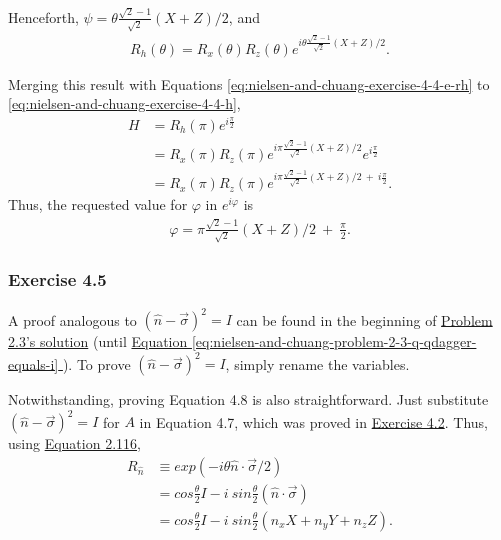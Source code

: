 Henceforth, $\psi = \theta \frac{\sqrt2 - 1}{\sqrt 2} (X + Z) / 2$, and
\begin{align}
    R_h(\theta) = R_x(\theta) R_z(\theta) e^{i \theta \frac{\sqrt2 - 1}{\sqrt 2} (X + Z) / 2}.
\end{align}

Merging this result with Equations
\ref{eq:nielsen-and-chuang-exercise-4-4-e-rh} to \ref{eq:nielsen-and-chuang-exercise-4-4-h},
\begin{align}
    H &= R_h(\pi) e^{i \frac \pi 2} \\
    &= R_x(\pi) R_z(\pi) e^{i \pi \frac{\sqrt2 - 1}{\sqrt 2} (X + Z) / 2} e^{i \frac \pi 2} \\
    &= R_x(\pi) R_z(\pi) e^{i \pi \frac{\sqrt2 - 1}{\sqrt 2} (X + Z) / 2\ +\ i \frac \pi 2}.
\end{align}
Thus, the requested value for $\varphi$ in $e^{i \varphi}$ is
\begin{align}
    \varphi = \pi \frac{\sqrt2 - 1}{\sqrt 2} (X + Z) / 2\ +\ \frac \pi 2.
\end{align}

\subsubsection{Exercise 4.5}
A proof analogous to $(\hat{n} - \vec{\sigma})^2 = I$ can be found in the beginning of
\hyperref[sec:nielsen-and-chuang-problem-2-3]{Problem 2.3's solution}
(until
\hyperref[eq:nielsen-and-chuang-problem-2-3-q-qdagger-equals-i]{
    Equation \ref{eq:nielsen-and-chuang-problem-2-3-q-qdagger-equals-i}
}).
To prove $(\hat{n} - \vec{\sigma})^2 = I$, simply rename the variables.

Notwithstanding, proving Equation 4.8 is also straightforward.
Just substitute $(\hat{n} - \vec{\sigma})^2 = I$ for $A$ in Equation 4.7,
which was proved in \hyperref[sec:nielsen-and-chuang-exercise-4-2]{Exercise 4.2}.
Thus, using \hyperref[sec:nielsen-and-chuang-equation-2-116]{Equation 2.116},
\begin{align}
    R_{\hat{n}} &\equiv exp(-i \theta \hat{n} \cdot \vec{\sigma}/2) \\
    &= cos \frac \theta 2 I - i\ sin \frac \theta 2 (\hat{n} \cdot \vec{\sigma}) \\
    &= cos \frac \theta 2 I - i\ sin \frac \theta 2 (n_x X + n_y Y + n_z Z).
\end{align}